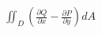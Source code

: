 \documentclass[preview]{standalone}
\begin{document}
\begin{align*}
\iint_D \left( \frac{\partial Q}{\partial x} - \frac{\partial P}{\partial y} \right) dA
\end{align*}
\end{document}

